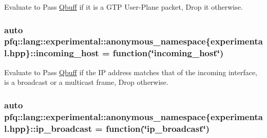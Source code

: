 Evaluate to {\ttfamily Pass} \hyperlink{structpfq_1_1lang_1_1Qbuff}{Qbuff} if it is a G\+TP User-\/\+Plane packet, {\ttfamily Drop} it otherwise. 

\subsubsection[{\texorpdfstring{incoming\+\_\+host}{incoming_host}}]{\setlength{\rightskip}{0pt plus 5cm}auto pfq\+::lang\+::experimental\+::anonymous\+\_\+namespace\{experimental.\+hpp\}\+::incoming\+\_\+host = {\bf function}(\char`\"{}incoming\+\_\+host\char`\"{})}\hypertarget{namespacepfq_1_1lang_1_1experimental_1_1anonymous__namespace_02experimental_8hpp_03_ac6e38127701ae032cf44cb9527131feb}{}\label{namespacepfq_1_1lang_1_1experimental_1_1anonymous__namespace_02experimental_8hpp_03_ac6e38127701ae032cf44cb9527131feb}


Evaluate to {\ttfamily Pass} \hyperlink{structpfq_1_1lang_1_1Qbuff}{Qbuff} if the IP address matches that of the incoming interface, is a broadcast or a multicast frame, {\ttfamily Drop} otherwise. 

\subsubsection[{\texorpdfstring{ip\+\_\+broadcast}{ip_broadcast}}]{\setlength{\rightskip}{0pt plus 5cm}auto pfq\+::lang\+::experimental\+::anonymous\+\_\+namespace\{experimental.\+hpp\}\+::ip\+\_\+broadcast = {\bf function}(\char`\"{}ip\+\_\+broadcast\char`\"{})}\hypertarget{namespacepfq_1_1lang_1_1experimental_1_1anonymous__namespace_02experimental_8hpp_03_a5fbdc84e9899dc881ed25e37fbdddabc}{}\label{namespacepfq_1_1lang_1_1experimental_1_1anonymous__namespace_02experimental_8hpp_03_a5fbdc84e9899dc881ed25e37fbdddabc}


